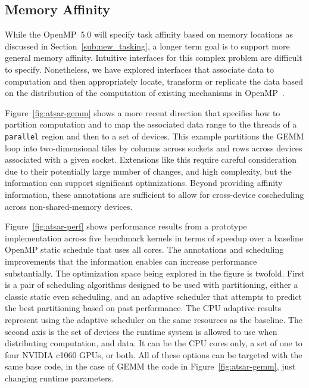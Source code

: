 \subsection{Memory Affinity}
\label{sub:memory_affinity}

While the OpenMP~5.0 will specify task affinity based on memory locations 
as discussed in Section~\ref{sub:new_tasking}, a longer term goal is to 
support more general memory affinity. Intuitive interfaces for this complex 
problem are difficult to specify. Nonetheless, we have explored interfaces
that associate data to computation and then appropriately locate, transform 
or replicate the data based on the distribution of the computation of existing
mechanisms in OpenMP~\cite{ctsar-tpds,scogland:7Hpt64iV}.
 
Figure~\ref{fig:atsar-gemm} shows a more recent direction that specifies how
to partition computation and to map the associated data range to the threads 
of a \texttt{parallel} region and then to a set of devices. This example partitions 
the GEMM loop into two-dimensional tiles by columns across sockets and rows 
across devices associated with a given socket. Extensions like this require 
careful consideration due to their potentially large number of changes, and 
high complexity, but the information can support significant optimizations.
Beyond providing affinity information, these annotations are sufficient to 
allow for cross-device coscheduling across non-shared-memory devices.

Figure~\ref{fig:atsar-perf} shows performance results from a prototype 
implementation across five benchmark kernels in terms of speedup over a 
baseline OpenMP static schedule that uses all cores. The annotations and 
scheduling improvements that the information enables can increase performance 
substantially.  The optimization space being explored in the figure is twofold.
First is a pair of scheduling algorithms designed to be used with partitioning,
either a classic static even scheduling, and an adaptive scheduler that attempts
to predict the best partitioning based on past performance.  The CPU adaptive
results represent using the adaptive scheduler on the same resources as the
baseline.  The second axis is the set of devices the runtime system is allowed
to use when distributing computation, and data.  It can be the CPU cores only, a
set of one to four NVIDIA c1060 GPUs, or both.  All of these options can be
targeted with the same base code, in the case of GEMM the code in
Figure~\ref{fig:atsar-gemm}, just changing runtime parameters.

